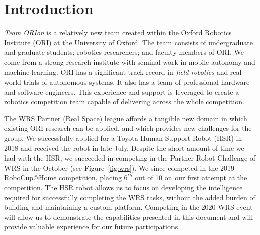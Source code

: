 \documentclass[runningheads,a4paper]{llncs}
\newcommand{\teamori}{Team ORIon}
\begin{document}

\section{Introduction}

\textit{\teamori{}} is a relatively new team created within the Oxford Robotics Institute
(ORI) at the University of Oxford. The team consists of undergraduate and
graduate students; robotics researchers; and faculty members of ORI. We come
from a strong research institute with seminal work in mobile autonomy and
machine learning. ORI has a significant track record in \emph{field robotics}
and real-world trials of autonomous systems. It also has a team of professional
hardware and software engineers. This experience and support is leveraged
to create a robotics competition team capable of delivering across the whole
competition. 

The WRS Partner (Real Space) league affords a tangible new domain in
which existing ORI research can be applied, and which provides new challenges
for the group.
We successfully applied for a Toyota Human Support Robot (HSR) in 2018
and received the robot in late July. Despite the short amount of time we
had with the HSR, we succeeded in competing in the Partner Robot Challenge of WRS in the October (see Figure~\ref{fig:wrs}). We since competed in the 2019 RoboCup@Home competition, placing $6^{th}$ out of 10 on our first attempt at the competition. 
The HSR robot allows us to focus on developing the
intelligence required for successfully completing the WRS tasks, 
without the added burden of building and maintaining a custom platform. 
Competing in the 2020 WRS event will allow us to demonstrate 
the capabilities presented in this document and will provide valuable experience
for our future participations.
\end{document}

